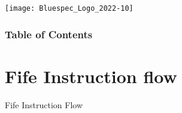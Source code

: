 


\date{L15: RISC-V: Fife pipelined CPU: principles}





\begin{frame}
 \titlepage

 \begin{center}
  \texttt{[image: Bluespec\_Logo\_2022-10]}
 \end{center}

\end{frame}





\begin{frame}
\frametitle{Table of Contents}

\tableofcontents

\end{frame}


\section{Fife Instruction flow}

\begin{frame}

\begin{center}
  {\LARGE Fife Instruction Flow}
\end{center}

\end{frame}


